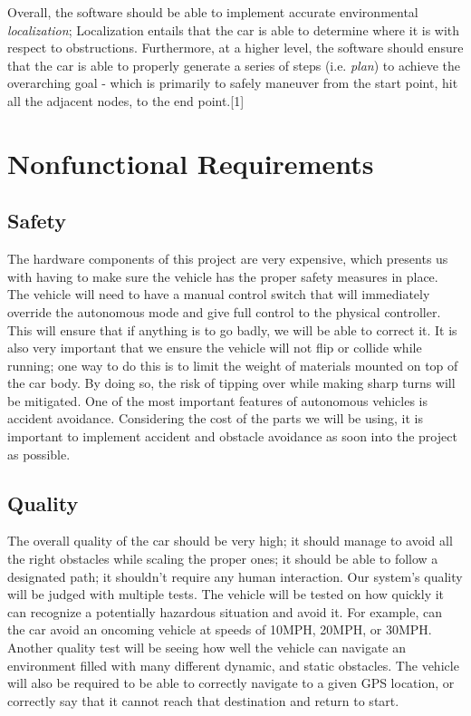 \documentclass[onecolumn, draftclsnofoot,10pt]{IEEEtran}
\begin{document}
    \bigskip

    \noindent Overall, the software should be able to implement accurate environmental \textit{localization}; Localization entails that the car is able to determine where it is with respect to obstructions. Furthermore, at a higher level, the software should ensure that the car is able to properly generate a series of steps (i.e. \textit{plan}) to achieve the overarching goal - which is primarily to safely maneuver from the start point, hit all the adjacent nodes, to the end point.[1]

\bigskip

\section{Nonfunctional Requirements}

\bigskip

\subsection{Safety}
    The hardware components of this project are very expensive, which presents us with having to make sure the vehicle has the proper safety measures in place. The vehicle will need to have a manual control switch that will immediately override the autonomous mode and give full control to the physical controller. This will ensure that if anything is to go badly, we will be able to correct it. It is also very important that we ensure the vehicle will not flip or collide while running; one way to do this is to limit the weight of materials mounted on top of the car body. By doing so, the risk of tipping over while making sharp turns will be mitigated. One of the most important features of autonomous vehicles is accident avoidance. Considering the cost of the parts we will be using, it is important to implement accident and obstacle avoidance as soon into the project as possible. 
    
\subsection{Quality}
    The overall quality of the car should be very high; it should manage to avoid all the right obstacles while scaling the proper ones; it should be able to follow a designated path; it shouldn't require any human interaction. Our system's quality will be judged with multiple tests. The vehicle will be tested on how quickly it can recognize a potentially hazardous situation and avoid it. For example, can the car avoid an oncoming vehicle at speeds of 10MPH, 20MPH, or 30MPH. Another quality test will be seeing how well the vehicle can navigate an environment filled with many different dynamic, and static obstacles. The vehicle will also be required to be able to correctly navigate to a given GPS location, or correctly say that it cannot reach that destination and return to start. 
    
\end{document}
